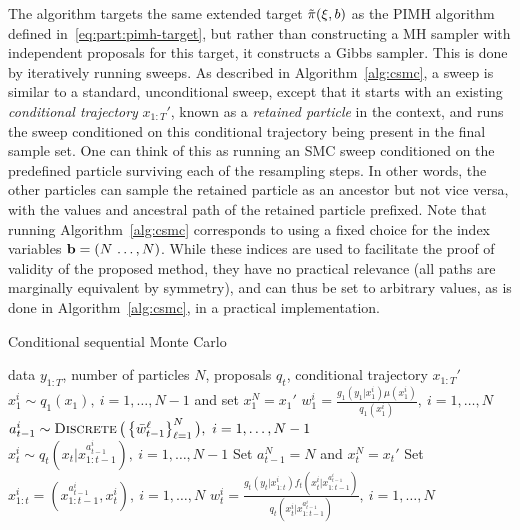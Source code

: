 The \pg algorithm targets the same extended target $\tilde{\pi}(\mathbf{\xi},b)$ as the PIMH algorithm defined
in~\eqref{eq:part:pimh-target}, but rather than constructing a MH sampler with independent proposals for
this target, it constructs a Gibbs sampler.  This is done by iteratively 
running \csmc sweeps. As described in Algorithm~\ref{alg:csmc},
a \csmc sweep is similar to a standard, unconditional \smc sweep, except that it starts
with an existing \emph{conditional trajectory} $x_{1:T}'$, known as a \emph{retained particle} in the \pg
context, and runs the sweep conditioned on this conditional trajectory being present in the final sample
set.  One can think of this as running an SMC sweep conditioned on the predefined particle surviving each
of the resampling steps.  In other words, the other particles can sample the retained particle as an
ancestor but not vice versa, with the values and ancestral path of the retained particle prefixed. 
Note that running Algorithm~\ref{alg:csmc} corresponds to using a fixed
choice for the index variables $\mathbf{b} = (N\,\ldots,N)$. While these indices are used to facilitate the
proof of validity of the proposed method, they have no practical relevance (all paths are marginally equivalent
by symmetry), and can thus be set to arbitrary
values, as is done in Algorithm~\ref{alg:csmc}, in a practical implementation.
\begin{algorithm}[tb]
	\caption{Conditional sequential Monte Carlo}
	\label{alg:csmc}
	\begin{spacing}{1.2}
		\begin{algorithmic}[1]
			\renewcommand{\algorithmicrequire}{\textbf{Inputs:}}
			\renewcommand{\algorithmicensure}{\textbf{Outputs:}}				 
			\Require data $y_{1:T}$, number of particles $N$, proposals $q_t$, conditional trajectory $x_{1:T}'$
			\State $x_1^i \sim q_1(x_1), ~i=1,\ldots,N-1$ and set $x_1^N = x_1'$
			\State $w_1^i = \frac{g_1(y_1|x_1^i) \mu(x_1^i)}{q_1(x_1^i)}, ~i=1,\ldots,N$
			\State $a_{t-1}^i \sim \operatorname*{\textsc{Discrete}}\big(\left\{\bar w_{t-1}^\ell\right\}_{\ell=1}^N\big), ~i=1,\ldots,N-1$
			\State $x_t^i \sim q_t(x_t | x_{1:t-1}^{a_{t-1}^i}), ~i=1,\ldots,N-1$
			\State Set $a_{t-1}^N = N$ and $x_t^N = x_t'$
			\State Set $x_{1:t}^i = (x_{1:t-1}^{a_{t-1}^i},x_t^i), ~i=1,\ldots,N$
			\State $w_t^i = \frac{g_t(y_t|x_{1:t}^i) f_t(x_t^i | x_{1:t-1}^{a_{t-1}^i})}{q_t(x_t^i|x_{1:t-1}^{a_{t-1}^i})}, ~i=1,\ldots,N$
			\EndFor
		\end{algorithmic}
	\end{spacing}
\end{algorithm}


